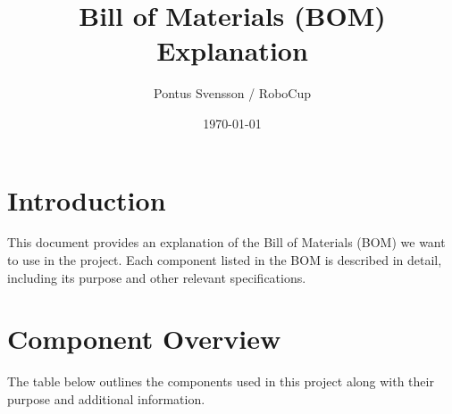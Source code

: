 \documentclass[a4paper,12pt]{article}
\title{Bill of Materials (BOM) Explanation}
\author{ Pontus Svensson / RoboCup }
\date{\today}
\begin{document}
  \maketitle

  \section*{Introduction} This document provides an explanation of the
  Bill of Materials (BOM) we want to use in the project. Each component
  listed in the BOM is described in detail, including its purpose and
  other relevant specifications.

  \section*{Component Overview} The table below outlines the components
  used in this project along with their purpose and additional
  information.
\end{document}
